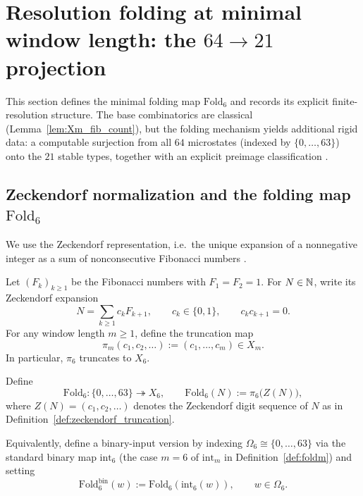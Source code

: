 
\section{Resolution folding at minimal window length: the \texorpdfstring{$64\to 21$}{64->21} projection}
\label{sec:folding_64_21}

This section defines the minimal folding map $\mathrm{Fold}_6$ and records its explicit finite-resolution structure.
The base combinatorics are classical (Lemma~\ref{lem:Xm_fib_count}), but the folding mechanism yields additional rigid data: a computable surjection from all $64$ microstates (indexed by $\{0,\dots,63\}$) onto the $21$ stable types, together with an explicit preimage classification \cite{Ma2025RF}.

\subsection{Zeckendorf normalization and the folding map \texorpdfstring{$\mathrm{Fold}_6$}{Fold6}}
\label{subsec:fold6_definition}

We use the Zeckendorf representation, i.e.\ the unique expansion of a nonnegative integer as a sum of nonconsecutive Fibonacci numbers \cite{Zeckendorf1972}.

\begin{definition}
\label{def:zeckendorf_truncation}
Let $(F_k)_{k\ge 1}$ be the Fibonacci numbers with $F_1=F_2=1$.
For $N\in\mathbb{N}$, write its Zeckendorf expansion
\[
N=\sum_{k\ge 1} c_k F_{k+1},
\qquad c_k\in\{0,1\},\qquad c_k c_{k+1}=0.
\]
For any window length $m\ge 1$, define the truncation map
\[
\pi_m(c_1,c_2,\dots):=(c_1,\dots,c_m)\in X_m.
\]
In particular, $\pi_6$ truncates to $X_6$.
\end{definition}

\begin{definition}
\label{def:fold6}
Define
\[
\mathrm{Fold}_6:\{0,\dots,63\}\twoheadrightarrow X_6,\qquad \mathrm{Fold}_6(N):=\pi_6\bigl(Z(N)\bigr),
\]
where $Z(N)=(c_1,c_2,\dots)$ denotes the Zeckendorf digit sequence of $N$ as in Definition~\ref{def:zeckendorf_truncation}.
\end{definition}

Equivalently, define a binary-input version by indexing $\Omega_6\cong\{0,\dots,63\}$ via the standard binary map $\mathrm{int}_6$ (the case $m=6$ of $\mathrm{int}_m$ in Definition~\ref{def:foldm}) and setting
\[
\mathrm{Fold}^{\mathrm{bin}}_6(w):=\mathrm{Fold}_6(\mathrm{int}_6(w)),\qquad w\in\Omega_6.
\]

